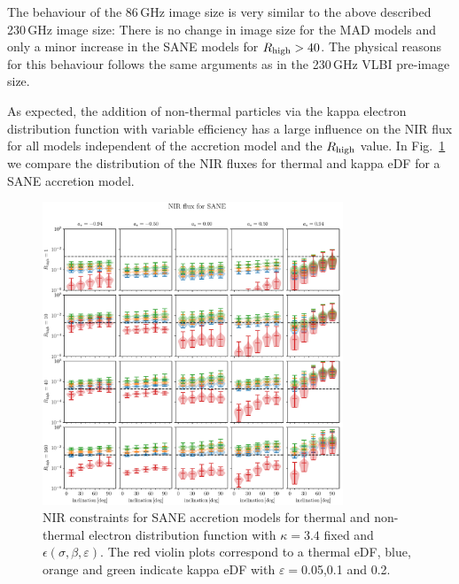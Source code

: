 
The behaviour of the 86\,GHz image size is very similar to the above described 230\,GHz image size: There is no change in image size for the MAD models and only a minor increase in the SANE models for $R_\mathrm{high}>40$. The physical reasons for this behaviour follows the same arguments as in the 230\,GHz VLBI pre-image size.

As expected, the addition of non-thermal particles via the kappa electron distribution function with variable efficiency has a large influence on the NIR flux for all models independent of the accretion model and the $R_\mathrm{high}$ value. In Fig.~\ref{fig:NIR_kappaepsilon} we compare the distribution of the NIR fluxes for thermal and kappa eDF for a SANE accretion model.

\begin{figure}
  \centering
  \includegraphics[width=0.8\textwidth]{./figures/SANE_NIR_standard.pdf}
  \caption{NIR constraints for SANE accretion models for thermal and non-thermal electron distribution function with $\kappa=3.4$ fixed and $\epsilon\left(\sigma,\beta,\varepsilon\right)$. The red violin plots correspond to a thermal eDF, blue, orange and green indicate kappa eDF with $\varepsilon=$0.05,0.1 and 0.2.}
  \label{fig:NIR_kappaepsilon}
\end{figure}

